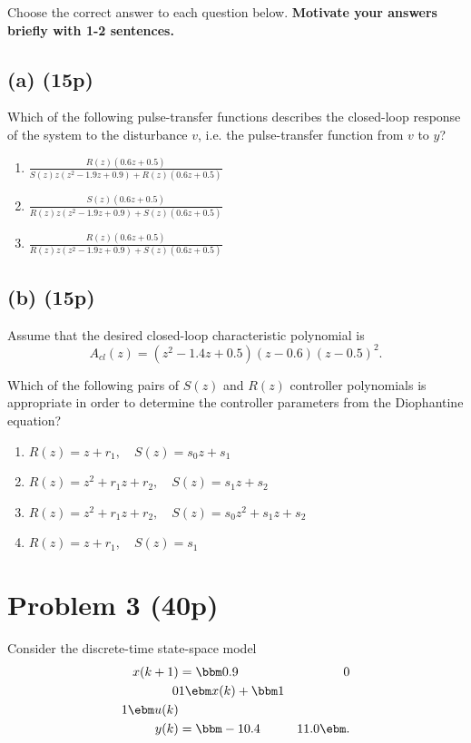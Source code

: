 \documentclass[a4paper]{scrartcl}
\begin{document}
Choose the correct answer to each question below. \textbf{Motivate your answers briefly with 1-2 sentences.}

\subsection*{(a) (15p)}
\label{sec-2-1}
Which of the following pulse-transfer functions describes the closed-loop response of the system to the disturbance $v$, i.e. the pulse-transfer function from $v$ to $y$?  
\begin{enumerate}
\item \( \frac{R(z) \left(0.6 z + 0.5\right)}{S(z) z \left(z^{2} - 1.9 z + 0.9\right) + R(z) \left(0.6 z + 0.5\right)} \)
\item \(\frac{S(z) \left(0.6 z + 0.5\right)}{R(z) z \left(z^{2} - 1.9 z + 0.9\right) + S(z) \left(0.6 z + 0.5\right)}\)
\item \( \frac{R(z) \left(0.6 z + 0.5\right)}{R(z) z \left(z^{2} - 1.9 z + 0.9\right) + S(z) \left(0.6 z + 0.5\right)} \)
\end{enumerate}
\subsection*{(b) (15p)}
\label{sec-2-2}
Assume that the desired closed-loop characteristic polynomial is
\[ A_{cl}(z) = (z^2 - 1.4z + 0.5)(z-0.6)(z-0.5)^2. \]

Which of the following pairs of $S(z)$ and $R(z)$ controller polynomials is appropriate in order to determine the controller parameters from the Diophantine equation?
\begin{enumerate}
\item \(R(z) = z + r_1, \quad S(z) = s_0z + s_1 \)
\item \(R(z) = z^2 + r_1z + r_2, \quad S(z) = s_1z + s_2 \)
\item \(R(z) = z^2 + r_1z + r_2, \quad S(z) = s_0z^2 + s_1z + s_2 \)
\item \(R(z) = z + r_1, \quad S(z) = s_1 \)
\end{enumerate}


\section*{Problem 3 (40p)}
\label{sec-3}
Consider the discrete-time state-space model
 \begin{equation*}
 \begin{split}
  x(k+1) &= \bbm 0.9 & 0\\0 & 1\ebm x(k) + \bbm 1\\1 \ebm u(k)\\
  y(k) &= \bbm -10.4 & 11.0 \ebm.
 \end{split}
\end{equation*}
\end{document}
